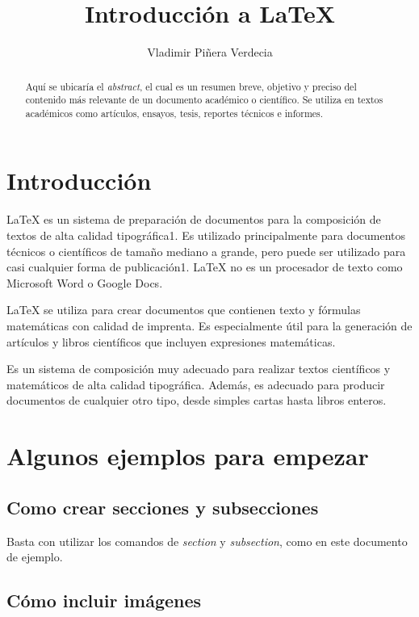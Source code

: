 \documentclass{article}
\title{Introducción a \LaTeX{}}
\author{Vladimir Piñera Verdecia}
\begin{document}
\maketitle

\begin{abstract}
Aquí se ubicaría el \emph{abstract}, el cual es un resumen breve, objetivo y preciso del contenido más relevante de un documento académico o científico. Se utiliza en textos académicos como artículos, ensayos, tesis, reportes técnicos e informes.
\end{abstract}

\section{Introducción}

LaTeX es un sistema de preparación de documentos para la composición de textos de alta calidad tipográfica1. Es utilizado principalmente para documentos técnicos o científicos de tamaño mediano a grande, pero puede ser utilizado para casi cualquier forma de publicación1. LaTeX no es un procesador de texto como Microsoft Word o Google Docs.

LaTeX se utiliza para crear documentos que contienen texto y fórmulas matemáticas con calidad de imprenta. Es especialmente útil para la generación de artículos y libros científicos que incluyen expresiones matemáticas.

Es un sistema de composición muy adecuado para realizar textos científicos y matemáticos de alta calidad tipográfica. Además, es adecuado para producir documentos de cualquier otro tipo, desde simples cartas hasta libros enteros.

\section{Algunos ejemplos para empezar}

\subsection{Como crear secciones y subsecciones}

Basta con utilizar los comandos de \emph{section} y \emph{subsection}, como en este documento de ejemplo.

\subsection{Cómo incluir imágenes}
\end{document}
